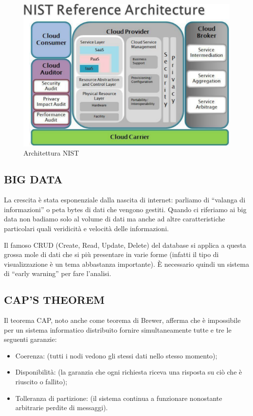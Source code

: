 \begin{center}
\begin{figure}[H]
\centering
\includegraphics[scale=1]{figures/NIST.png}
\caption{Architettura NIST}
\end{figure}
\end{center}

\subsection{BIG DATA}


La crescita è stata esponenziale dalla nascita di internet: parliamo di “valanga di informazioni”  o peta bytes di dati che vengono gestiti. Quando ci riferiamo ai big data non badiamo solo al volume di dati ma anche ad altre caratteristiche particolari quali veridicità e velocità delle informazioni. 

Il famoso CRUD (Create, Read, Update, Delete) del database si applica a questa grossa mole  di dati che si più presentare in varie forme (infatti il tipo di visualizzazione è un tema abbastanza importante). È necessario quindi un sistema di “early warning” per fare l’analisi.

\subsection{CAP'S THEOREM}

Il teorema CAP, noto anche come teorema di Brewer, afferma che è impossibile per un sistema informatico distribuito fornire simultaneamente tutte e tre le seguenti garanzie: 

\begin{itemize}

\item{Coerenza}: (tutti i nodi vedono gli stessi dati nello stesso momento);
\item{Disponibilità}: (la garanzia che ogni richiesta riceva una risposta su ciò che è riuscito o fallito);
\item{Tolleranza di partizione}: (il sistema continua a funzionare nonostante arbitrarie perdite di messaggi).

\end{itemize}

